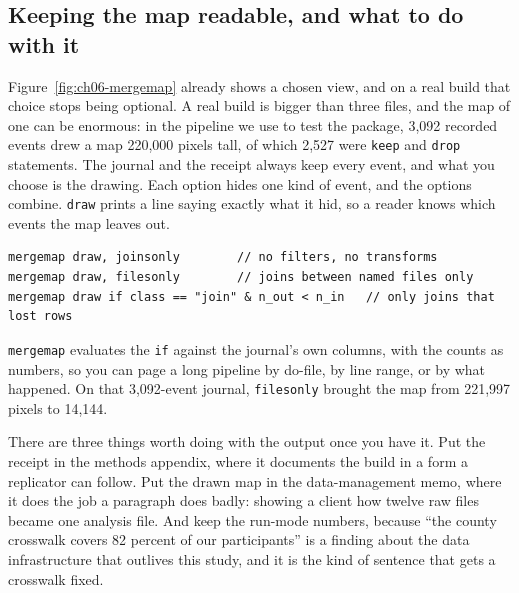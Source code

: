 \subsection{Keeping the map readable, and what to do with it}
Figure~\ref{fig:ch06-mergemap} already shows a chosen view, and on a real build that choice stops being optional. A real build is bigger than three files, and the map of one can be enormous: in the pipeline we use to test the package, 3,092 recorded events drew a map 220,000 pixels tall, of which 2,527 were \texttt{keep} and \texttt{drop} statements. The journal and the receipt always keep every event, and what you choose is the drawing. Each option hides one kind of event, and the options combine. \texttt{draw} prints a line saying exactly what it hid, so a reader knows which events the map leaves out.
\par
{\footnotesize
\begin{verbatim}
mergemap draw, joinsonly        // no filters, no transforms
mergemap draw, filesonly        // joins between named files only
mergemap draw if class == "join" & n_out < n_in   // only joins that lost rows
\end{verbatim}
}
\texttt{mergemap} evaluates the \texttt{if} against the journal's own columns, with the counts as numbers, so you can page a long pipeline by do-file, by line range, or by what happened. On that 3,092-event journal, \texttt{filesonly} brought the map from 221,997 pixels to 14,144.

There are three things worth doing with the output once you have it. Put the receipt in the methods appendix, where it documents the build in a form a replicator can follow. Put the drawn map in the data-management memo, where it does the job a paragraph does badly: showing a client how twelve raw files became one analysis file. And keep the run-mode numbers, because \enquote{the county crosswalk covers 82 percent of our participants} is a finding about the data infrastructure that outlives this study, and it is the kind of sentence that gets a crosswalk fixed.


